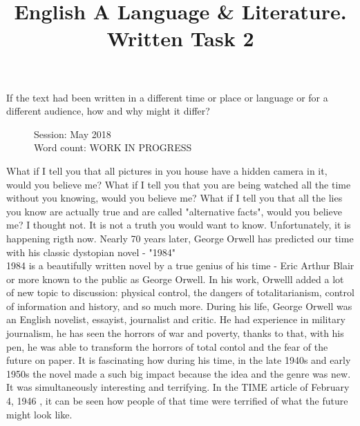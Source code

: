 \documentclass[a4paper,12pt]{article}
\title{English A Language \& Literature. Written Task 2}
\date{}
\author{}
\begin{document}
\maketitle
\begin{center}
  If the text had been written in a different time or place or language or for a different audience, how and why might it differ?
\end{center}
\begin{flushleft}
  \begin{figure}
    Session: May 2018\\
    Word count: WORK IN PROGRESS\\
    \end{figure}
\end{flushleft}
\newpage

What if I tell you that all pictures in you house have a hidden camera in it, would you believe me? What if I tell you that you are being watched all the time without you knowing, would you believe me?  What if I tell you that all the lies you know are actually true and are called "alternative facts", would you believe me? I thought not. It is not a truth you would want to know. Unfortunately, it is happening rigth now. Nearly 70 years later, George Orwell has predicted our time with his classic dystopian novel - "1984"\\

1984 is a beautifully written novel by a true genius of his time - Eric Arthur Blair or more known to the public as George Orwell. In his work, Orwelll added a lot of new topic to discussion: physical control, the dangers of totalitarianism, control of information and history, and so much more. During his life, George Orwell was an English novelist, essayist, journalist and critic. He had experience in military journalism, he has seen the horrors of war and poverty, thanks to that, with his pen, he was able to transform the horrors of total contol and the fear of the future on paper. It is fascinating how during his time, in the late 1940s and early 1950s the novel made a such big impact because the idea and the genre was new. It was simultaneously interesting and terrifying. In the TIME article of February 4, 1946 \cite{time}, it can be seen how people of that time were terrified of what the future might look like. \\

\newpage


\end{document}
